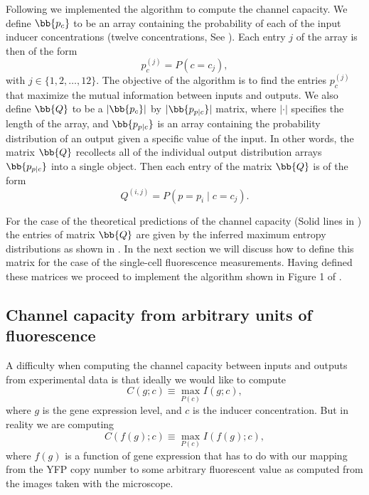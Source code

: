 Following \cite{Blahut1972} we implemented the algorithm to compute the channel
capacity. We define $\bb{p_c}$ to be an array containing the probability of each
of the input inducer concentrations (twelve concentrations, See ).
Each entry $j$ of the array is then of the form
\begin{equation}
  p_c^{(j)} = P(c = c_j),
\end{equation}
with $j \in \{1, 2, \ldots, 12 \}$. The objective of the algorithm is to find
the entries $p_c^{(j)}$ that maximize the mutual information between inputs and
outputs. We also define $\bb{Q}$ to be a $\vert \bb{p_c} \vert$ by
$\vert \bb{p_{p \mid c}} \vert$ matrix, where $\vert \cdot \vert$ specifies the
length of the array, and $\bb{p_{p \mid c}}$ is an array containing the
probability distribution of an output given a specific value of the input. In
other words, the matrix $\bb{Q}$ recollects all of the individual output
distribution arrays $\bb{p_{p \mid c}}$ into a single object. Then each entry
of the matrix $\bb{Q}$ is of the form
\begin{equation}
  Q^{(i, j)} = P(p = p_i \mid c = c_j).
\end{equation}

For the case of the theoretical predictions of the channel capacity (Solid
lines in ) the entries of matrix $\bb{Q}$ are given by the
inferred maximum entropy distributions as shown in . In the
next section we will discuss how to define this matrix for the case of the
single-cell fluorescence measurements. Having defined these matrices we proceed
to implement the algorithm shown in Figure 1 of \cite{Blahut1972}.

\subsection{Channel capacity from arbitrary units of fluorescence}

A difficulty when computing the channel capacity between inputs and outputs from
experimental data is that ideally we would like to compute
\begin{equation}
C(g; c) \equiv \max_{P(c)} I(g; c),
\end{equation}
where $g$ is the gene expression level, and $c$ is the inducer concentration.
But in reality we are computing
\begin{equation}
C(f(g); c) \equiv \max_{P(c)} I(f(g); c),
\end{equation}
where $f(g)$ is a function of gene expression that has to do with our mapping
from the YFP copy number to some arbitrary fluorescent value as computed from
the images taken with the microscope.

